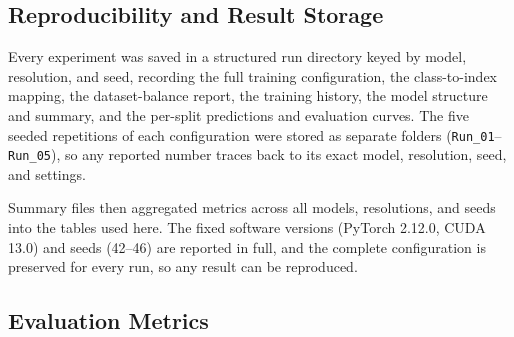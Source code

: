 \documentclass[conference]{IEEEtran}
\begin{document}
\subsection{Reproducibility and Result Storage}

Every experiment was saved in a structured run directory keyed by model, resolution, and seed, recording the full training configuration, the class-to-index mapping, the dataset-balance report, the training history, the model structure and summary, and the per-split predictions and evaluation curves. The five seeded repetitions of each configuration were stored as separate folders (\texttt{Run\_01}--\texttt{Run\_05}), so any reported number traces back to its exact model, resolution, seed, and settings.

Summary files then aggregated metrics across all models, resolutions, and seeds into the tables used here. The fixed software versions (PyTorch 2.12.0, CUDA 13.0) and seeds (42--46) are reported in full, and the complete configuration is preserved for every run, so any result can be reproduced.

\subsection{Evaluation Metrics}
\end{document}

